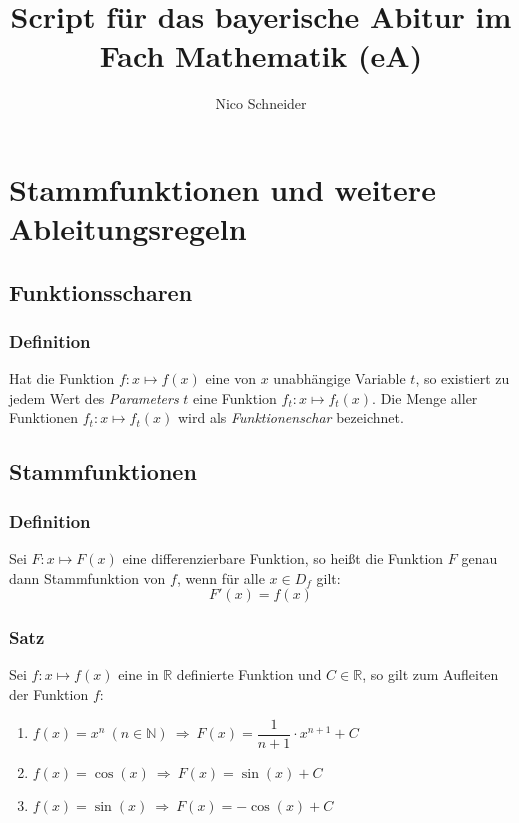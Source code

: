\documentclass[a4paper,12pt]{article}
\newcommand{\N}{\mathbb{N}}
\newcommand{\R}{\mathbb{R}}
\begin{document}
\title{Script für das bayerische Abitur im Fach Mathematik (eA)}
\author{Nico Schneider}
\maketitle
\thispagestyle{empty}
\newpage

\tableofcontents
\thispagestyle{empty}

\newpage

\section{Stammfunktionen und weitere Ableitungsregeln}

\subsection{Funktionsscharen}

\subsubsection{Definition}
Hat die Funktion $f:x\mapsto f(x)$ eine von $x$ unabhängige Variable $t$, so existiert zu jedem Wert des \emph{Parameters} $t$ eine Funktion $f_t:x\mapsto f_t(x)$. Die Menge aller Funktionen $f_t:x\mapsto f_t(x)$ wird als \emph{Funktionenschar} bezeichnet.

\subsection{Stammfunktionen}

\subsubsection{Definition}

Sei $F:x\mapsto F(x)$ eine differenzierbare Funktion, so heißt die Funktion $F$ genau dann Stammfunktion von $f$, wenn für alle $x\in D_f$ gilt:
\[ F'(x) = f(x)\]


\subsubsection{Satz}
Sei $f:x\mapsto f(x)$ eine in $\R$ definierte Funktion und $C \in \R$, so gilt zum Aufleiten der Funktion $f$:
\begin{enumerate}
\item $f(x) = x^n \ (n \in \N )\  \Rightarrow \  F(x)=\dfrac{1}{n+1}\cdot x^{n+1} +C$
\item $f(x)=\cos(x)\ \Rightarrow \ F(x)=\sin(x) + C$
\item $f(x)=\sin(x) \ \Rightarrow \ F(x)=-\cos(x) + C$
\end{enumerate}
\end{document}
